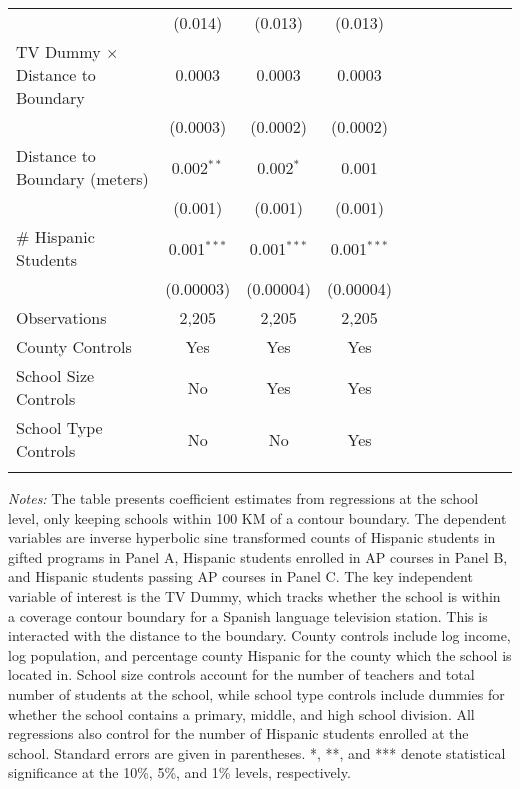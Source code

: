 \begin{table}[!h]
{\begin{threeparttable}
\begin{tabular}{lcccccccccc}
  & (0.014) & (0.013) & (0.013) \\ 
 TV Dummy $\times$ Distance to Boundary & 0.0003 & 0.0003 & 0.0003 \\ 
  & (0.0003) & (0.0002) & (0.0002) \\ 
 Distance to Boundary (meters) & 0.002$^{**}$ & 0.002$^{*}$ & 0.001 \\ 
  & (0.001) & (0.001) & (0.001) \\ 
 \# Hispanic Students & 0.001$^{***}$ & 0.001$^{***}$ & 0.001$^{***}$ \\ 
  & (0.00003) & (0.00004) & (0.00004) \\ 
Observations & 2,205 & 2,205 & 2,205 \\                 
\hline\hline\addlinespace
                                County Controls & Yes & Yes  & Yes\\
                                School Size Controls & No & Yes & Yes\\
                                School Type Controls & No & No & Yes \\
				\addlinespace\hline\hline
			\end{tabular}
			\begin{tablenotes}[flushleft]
				\item \textit{Notes:} The table presents coefficient estimates from regressions at the school level, only keeping schools within 100 KM of a contour boundary. The dependent variables are inverse hyperbolic sine transformed counts of Hispanic students in gifted programs in Panel A, Hispanic students enrolled in AP courses in Panel B, and Hispanic students passing AP courses in Panel C. The key independent variable of interest is the TV Dummy, which tracks whether the school is within a coverage contour boundary for a Spanish language television station. This is interacted with the distance to the boundary. County controls include log income, log population, and percentage county Hispanic for the county which the school is located in. School size controls account for the number of teachers and total number of students at the school, while school type controls include dummies for whether the school contains a primary, middle, and high school division. All regressions also control for the number of Hispanic students enrolled at the school. Standard errors are given in parentheses. *, **, and *** denote statistical significance at the 10\%, 5\%, and 1\% levels, respectively.
			\end{tablenotes}
		\end{threeparttable}
	}
\end{table}